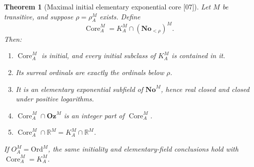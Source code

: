 \documentclass[11pt,a4paper]{article}
\numberwithin{equation}{section}
\newtheorem{theorem}{Theorem}[section]
\theoremstyle{definition}
\theoremstyle{remark}
\newcommand{\No}{\mathbf{No}}
\newcommand{\Oz}{\mathbf{Oz}}
\newcommand{\Ord}{\mathrm{Ord}}
\newcommand{\R}{\mathbb R}
\newcommand{\Core}{\operatorname{Core}}
\newcommand{\src}[1]{\textup{\textsf{\small[#1]}}}
\begin{document}
\begin{theorem}[Maximal initial elementary exponential core \src{07}]\label{dsn:thm:core}
Let $M$ be transitive, and suppose $\rho=\rho^M_A$ exists. Define
\begin{equation}\label{dsn:eq:core}
 \Core^M_A=K^M_A\cap(\No_{<\rho})^M.
\end{equation}
Then:
\begin{enumerate}[label=\textup{(\roman*)}]
\item $\Core^M_A$ is initial, and every initial subclass of $K^M_A$ is
contained in it.
\item Its surreal ordinals are exactly the ordinals below $\rho$.
\item It is an elementary exponential subfield of $\No^M$, hence real
closed and closed under positive logarithms.
\item $\Core^M_A\cap\Oz^M$ is an integer part of $\Core^M_A$.
\item $\Core^M_A\cap\R^M=K^M_A\cap\R^M$.
\end{enumerate}
If $O^M_A=\Ord^M$, the same initiality and elementary-field conclusions
hold with $\Core^M_A=K^M_A$.
\end{theorem}
\end{document}
